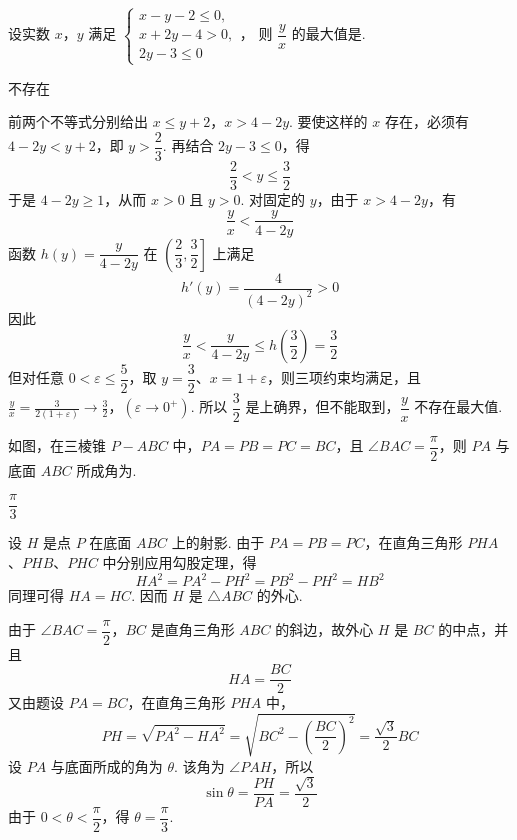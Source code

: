 \begin{problem}
设实数 \(x\)，\(y\) 满足
\(\begin{cases}
x-y-2\leqslant0,\\
x+2y-4>0,\\
2y-3\leqslant0
\end{cases}\)，
则 \(\dfrac yx\) 的最大值是\fillinblank{}.
\end{problem}

\begin{answer}
不存在
\end{answer}

\begin{solution}
前两个不等式分别给出
\(x\leqslant y+2\)，\(x>4-2y\).
要使这样的 \(x\) 存在，必须有 \(4-2y<y+2\)，即 \(y>\dfrac23\). 再结合 \(2y-3\leqslant0\)，得
\[
\frac23<y\leqslant\frac32
\]
于是 \(4-2y\geqslant1\)，从而 \(x>0\) 且 \(y>0\). 对固定的 \(y\)，由于 \(x>4-2y\)，有
\[
\frac yx<\frac{y}{4-2y}
\]
函数 \(h(y)=\dfrac{y}{4-2y}\) 在 \(\left(\dfrac23,\dfrac32\right]\) 上满足
\[
h'(y)=\frac4{(4-2y)^2}>0
\]
因此
\[
\frac yx<\frac{y}{4-2y}\leqslant h\left(\frac32\right)=\frac32
\]
但对任意 \(0<\varepsilon\leqslant\dfrac52\)，取 \(y=\dfrac32\)、\(x=1+\varepsilon\)，则三项约束均满足，且
\(\frac yx=\frac{3}{2(1+\varepsilon)}\longrightarrow\frac32\)，\((\varepsilon\to0^+)\).
所以 \(\dfrac32\) 是上确界，但不能取到，\(\dfrac yx\) 不存在最大值.
\end{solution}

\begin{problem}
如图，在三棱锥 \(P-ABC\) 中，\(PA=PB=PC=BC\)，且 \(\angle BAC=\dfrac\pi2\)，则 \(PA\) 与底面 \(ABC\) 所成角为\fillinblank{}.

\end{problem}

\begin{answer}
\(\dfrac\pi3\)
\end{answer}

\begin{solution}
设 \(H\) 是点 \(P\) 在底面 \(ABC\) 上的射影. 由于 \(PA=PB=PC\)，在直角三角形 \(PHA\)、\(PHB\)、\(PHC\) 中分别应用勾股定理，得
\[
HA^2=PA^2-PH^2=PB^2-PH^2=HB^2
\]
同理可得 \(HA=HC\). 因而 \(H\) 是 \(\triangle ABC\) 的外心.

由于 \(\angle BAC=\dfrac\pi2\)，\(BC\) 是直角三角形 \(ABC\) 的斜边，故外心 \(H\) 是 \(BC\) 的中点，并且
\[
HA=\frac{BC}{2}
\]
又由题设 \(PA=BC\)，在直角三角形 \(PHA\) 中，
\[
PH=\sqrt{PA^2-HA^2}
=\sqrt{BC^2-\left(\frac{BC}{2}\right)^2}
=\frac{\sqrt3}{2}BC
\]
设 \(PA\) 与底面所成的角为 \(\theta\). 该角为 \(\angle PAH\)，所以
\[
\sin\theta=\frac{PH}{PA}=\frac{\sqrt3}{2}
\]
由于 \(0<\theta<\dfrac\pi2\)，得 \(\theta=\dfrac\pi3\).
\end{solution}

